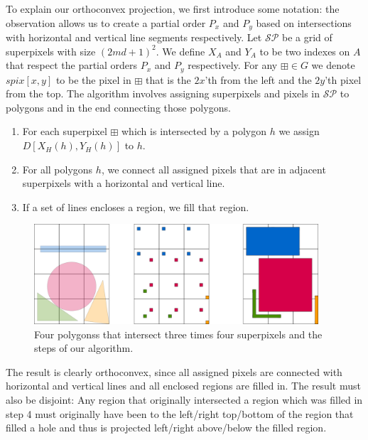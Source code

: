 \documentclass[a4paper, UKenglish]{lipics-v2018}
\newcommand{\spg}{\mathcal{S\!P}}
\newcommand{\spix}{\boxplus}
\begin{document}
To explain our orthoconvex projection, we first introduce some notation: the observation allows us to create a partial order $P_x$ and $P_y$ based on intersections with horizontal and vertical line segments respectively. Let $\spg$ be a grid of superpixels with size $(2md+1)^2$. We define $X_A$ and $Y_A$ to be two indexes on $A$ that respect the partial orders $P_x$ and $P_y$ respectively. For any $\spix \in G$ we denote $spix[x,y]$ to be the pixel in $\spix$ that is the $2x$'th from the left and the $2y$'th pixel from the top. The algorithm involves assigning superpixels and pixels in $\spg$ to polygons and in the end connecting those polygons.

\begin{enumerate}
\item For each superpixel $\spix$ which is intersected by a polygon $h$ we assign $D[X_H(h), Y_H(h)]$ to $h$.
\item For all polygons $h$, we connect all assigned pixels that are in adjacent superpixels with a horizontal and vertical line. 
\item If a set of lines encloses a region, we fill that region.
\end{enumerate}


\begin{figure}[H]
\centering
\includegraphics[width=400px]{Figures/convexprojection.png}
\caption{Four polygonss that intersect three times four superpixels and the steps of our algorithm.}
\label{fig:convexprojection}
\end{figure}

The result is clearly orthoconvex, since all assigned pixels are connected with horizontal and vertical lines and all enclosed regions are filled in. The result must also be disjoint: Any region that originally intersected a region which was filled in step 4 must originally have been to the left/right top/bottom of the region that filled a hole and thus is projected left/right above/below the filled region.
\end{document}

